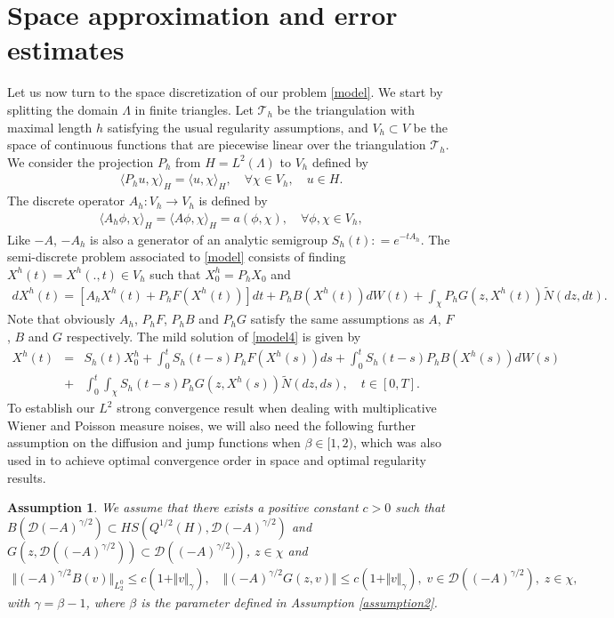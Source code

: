 \documentclass[review,12pt]{elsarticle}
\newtheorem{Assumption}{Assumption}[section]
\begin{document}
 \section{Space approximation and error estimates}
 \label{spacediscretization}
Let us now turn to the space discretization of our problem \eqref{model}.  We start by  splitting  the domain $\Lambda$ in finite triangles.
Let $\mathcal{T}_h$ be the triangulation with maximal length $h$ satisfying the usual regularity assumptions, and  $V_h \subset V$ be the space of continuous functions that are 
piecewise linear over the triangulation $\mathcal{T}_h$. 
We consider the projection $P_h$ from $H=L^2(\Lambda)$ to $V_h$ defined by
\begin{eqnarray}
\label{projection}
\langle P_hu,\chi\rangle_H=\langle u,\chi\rangle_H, \quad \forall \chi\in V_h,\quad u\in H.
\end{eqnarray}
The discrete operator $A_h : V_h\longrightarrow V_h$ is defined by 
\begin{eqnarray}
\label{discreteoperator}
\langle A_h\phi,\chi\rangle_H=\langle A\phi,\chi\rangle_H=a(\phi,\chi),\quad \forall \phi,\chi\in V_h,
\end{eqnarray}
Like $-A$, $-A_h$ is also a generator of an analytic semigroup $S_h(t) : =e^{-tA_h}$.
The semi-discrete problem associated to \eqref{model} consists of finding $X^h(t)=X^h(.,t)\in V_h$ such that $X^h_0=P_hX_0$ and 
\begin{eqnarray}
\label{model4}
dX^h(t)=[A_hX^h(t)+P_hF(X^h(t))]dt+P_hB(X^h(t))dW(t)+\int_{\chi}P_hG(z,X^h(t))\widetilde{N}(dz,dt).
\end{eqnarray}
Note that obviously $A_h$, $P_hF$, $P_hB$ and $P_hG$ satisfy the same assumptions as $A$, $F$, $B$ and $G$ respectively. The mild solution of \eqref{model4} is given by
\begin{eqnarray}
\label{mild2}
X^h(t)&=&S_h(t)X^h_0+\int_0^tS_h(t-s)P_hF(X^h(s))ds+\int_0^tS_h(t-s)P_hB(X^h(s))dW(s)\nonumber\\
&+&\int_0^t\int_{\chi}S_h(t-s)P_hG(z, X^h(s))\widetilde{N}(dz,ds),\quad t\in[0,T].
\end{eqnarray}
To establish  our $L^2$ strong convergence result when dealing with multiplicative Wiener and Poisson measure noises, we will also need the following further assumption on the diffusion and jump functions when $\beta \in [1,2)$, which was also used in  \cite{Antonio1,Raphael,Stig1} to achieve optimal convergence order in space and optimal regularity results.
\begin{Assumption}
\label{assumption6}
We assume that there exists a positive constant $c>0$ such 
that $B\left(\mathcal{D}(-A)^{\gamma/2}\right)\subset HS\left(Q^{1/2}(H),\mathcal{D}(-A)^{\gamma/2}\right)$ and $G\left(z, \mathcal{D}((-A)^{\gamma/2})\right)\subset\mathcal{D}\left((-A)^{\gamma/2})\right)$, $z\in \chi$ and
\begin{eqnarray}
\Vert (-A)^{\gamma/2}B(v)\Vert_{L^0_2}\leq c(1+\Vert v\Vert_{\gamma}),\quad \Vert (-A)^{\gamma/2}G(z,v)\Vert\leq c(1+\Vert v\Vert_{\gamma}),\; v\in \mathcal{D}((-A)^{\gamma/2}),\; z\in \chi,
\end{eqnarray}
with $\gamma=\beta-1$, where $\beta$ is the parameter defined in Assumption \ref{assumption2}.
\end{Assumption}
\end{document}
